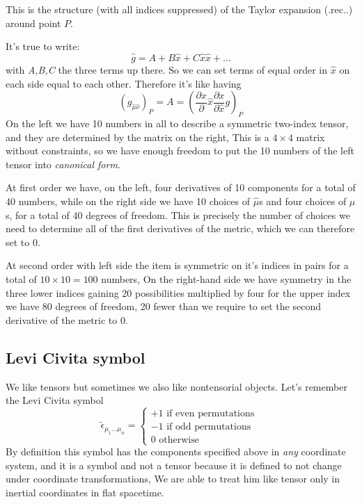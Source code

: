 This is the structure (with all indices suppressed) of the Taylor expansion (.rec..) around point $P$. \par
It's true to write:
\[
	\hat{g} = A+ B \hat{x} + C \hat{x}\hat{x} + \ldots 
\]
with \emph{A,B,C} the three terms up there. So we can set terms of equal order in $\hat{x}$ on each side equal to each other. Therefore it's like having
\[
	\left( g_{\hat{\mu }\hat{\nu }} \right)_{P} = A = \left( \frac{\partial x}{\partial } \hat{x} \frac{\partial x}{\partial \hat{x}} g  \right)_{P}
\]
On the left we have 10 numbers in all to describe a symmetric two-index tensor, and they are determined by the matrix on the right, This is a $4\times 4$ matrix without constraints, so we have enough freedom to put the 10 numbers of the left tensor into \emph{canonical form}.\par
At first order we have, on the left, four derivatives of 10 components for a total of 40 numbers, while on the right side we have 10 choices of $\hat{\mu }$s and four choices of $\mu$s, for a total of 40 degrees of freedom. This is precisely the number of choices we need to determine all of the first derivatives of the metric, which we can therefore set to 0. \par
At second order with left side the item is symmetric on it's indices in pairs for a total of $10 \times 10 = 100$ numbers, On the right-hand side we have symmetry in the three lower indices gaining 20 possibilities multiplied by four for the upper index we have 80 degrees of freedom, 20 fewer than we require to set the second derivative of the metric to 0.\par

\subsection{Levi Civita symbol}
We like tensors but sometimes we also like nontensorial objects.
Let's remember the Levi Civita symbol 
\[
	\tilde{\epsilon}_{\mu _{1}\ldots \mu _{n }} = \begin{cases}
	+1 \text{ if even permutations } \\
	-1 \text{ if odd permutations } \\
	0 \text{ otherwise }
	\end{cases}	
\]
By definition this symbol has the components specified above in \emph{any} coordinate system, and it is a symbol and not a tensor because it is defined to not change under coordinate transformations, We are able to treat him like tensor only in inertial coordinates in flat spacetime.

